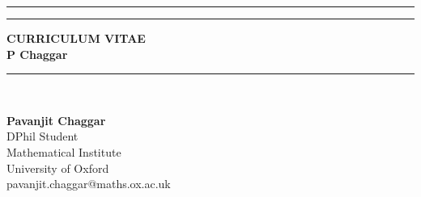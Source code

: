 \documentclass[11pt, a4paper]{resume}
\begin{document}
\cfoot{}
\chead{}
\lfoot{}
\lhead{}
\rhead{}
\pagestyle{fancyplain}
\renewcommand{\headrulewidth}{0.0pt}
\begin{center}
\hrule depth 0.5pt
\vspace{3pt}
\hrule
\vspace{5pt}
\uppercase{\bfseries {\large C}urriculum vitae}\\
\textbf{P Chaggar}
\vspace{5pt}
\hrule depth 0.5pt
\vspace{3.0cm}~
\end{center}
\vspace{-3.0cm}

\textbf{Pavanjit Chaggar} \\
DPhil Student \\ Mathematical Institute \\ University of Oxford \\
pavanjit.chaggar@maths.ox.ac.uk \\

\vspace{-0.5cm}




% 



% 

% 
\end{document}
